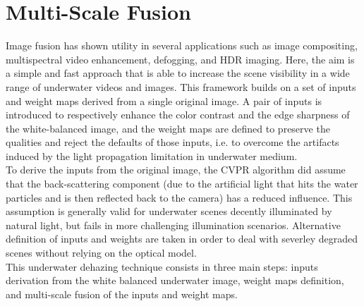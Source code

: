 \documentclass[hidelinks, 12pt]{report}
\begin{document}
\chapter{Multi-Scale Fusion}
\justify
Image fusion has shown utility in several applications such as image compositing, multispectral video enhancement, defogging, and HDR imaging. Here, the aim is a simple and fast approach that is able to increase the scene visibility in a wide range of underwater videos and images. This framework builds on a set of inputs and weight maps derived from a single original image. A pair of inputs is introduced to respectively enhance the color contrast and the edge sharpness of the white-balanced image, and the weight maps are defined to preserve the qualities and reject the defaults of those inputs, i.e. to overcome the artifacts induced by the light propagation limitation in underwater medium.\\To derive the inputs from the original image, the CVPR algorithm did assume that the back-scattering component (due to the artificial light that hits the water particles and is then reflected back to the camera) has a reduced influence. This assumption is generally valid for underwater scenes decently illuminated by natural light, but fails in more challenging illumination scenarios. Alternative definition of inputs and weights are taken in order to deal with severley degraded scenes without relying on the optical model.\\ This underwater dehazing technique consists in three main steps: inputs derivation from the white balanced underwater image, weight maps definition, and multi-scale fusion of the inputs and weight maps.
\end{document}
